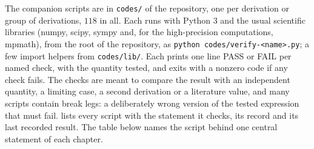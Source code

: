 The companion scripts are in \nolinkurl{codes/} of the repository, one per derivation or group of derivations, $118$ in all.
Each runs with Python 3 and the usual scientific libraries (numpy, scipy, sympy and, for the high-precision computations, mpmath), from the root of the repository, as \texttt{python codes/verify-<name>.py}; a few import helpers from \nolinkurl{codes/lib/}.
Each prints one line PASS or FAIL per named check, with the quantity tested, and exits with a nonzero code if any check fails.
The checks are meant to compare the result with an independent quantity, a limiting case, a second derivation or a literature value, and many scripts contain break legs: a deliberately wrong version of the tested expression that must fail.
 lists every script with the statement it checks, its record and its last recorded result.
The table below names the script behind one central statement of each chapter.

